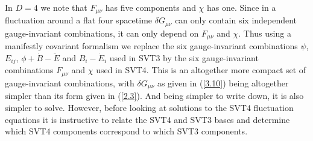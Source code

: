 In $D=4$ we note that $F_{\mu\nu}$ has five components and $\chi$ has one. Since in a fluctuation around a flat four spacetime $\delta G_{\mu\nu}$ can only contain six independent gauge-invariant combinations, it can only depend on $F_{\mu\nu}$ and $\chi$. Thus using a manifestly covariant formalism we replace the six gauge-invariant combinations $\psi$, $E_{ij}$,  $\phi+\dot{B}-\ddot{E}$ and $B_i-\dot{E}_i$ used in SVT3 by the six gauge-invariant combinations $F_{\mu\nu}$ and $\chi$ used in SVT4. This is an altogether more compact set of gauge-invariant combinations, with $\delta G_{\mu\nu}$ as given in (\ref{3.10}) being altogether simpler than its form given in (\ref{2.3}). And being simpler to write down, it is also simpler to solve. However, before looking at solutions to the SVT4 fluctuation equations it is instructive to relate the SVT4 and SVT3 bases and determine which SVT4 components correspond to which SVT3 components.

